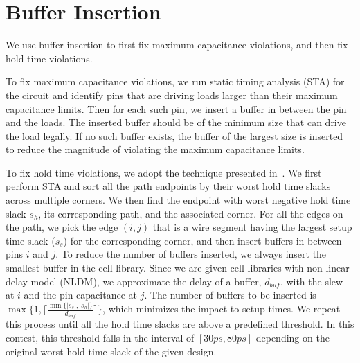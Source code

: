 \section{Buffer Insertion}
\label{sec:buf_insert}
We use buffer insertion to first fix maximum capacitance violations, and then fix hold time violations.

To fix maximum capacitance violations, we run static timing analysis (STA) for the circuit and identify pins that are driving loads larger than their maximum capacitance limits. Then for each such pin, we insert a buffer in between the pin and the loads. The inserted buffer should be of the minimum size that can drive the load legally. If no such buffer exists, the buffer of the largest size is inserted to reduce the magnitude of violating the maximum capacitance limits.

To fix hold time violations, we adopt the technique presented in~\cite{Shenoy:Minimum}. We first perform STA and sort all the path endpoints by their worst hold time slacks across multiple corners. We then find the endpoint with worst negative hold time slack $s_h$, its corresponding path, and the associated corner. For all the edges on the path, we pick the edge $(i, j)$ that is a wire segment having the largest setup time slack ($s_s$) for the corresponding corner, and then insert buffers in between pins $i$ and $j$. To reduce the number of buffers inserted, we always insert the smallest buffer in the cell library. Since we are given cell libraries with non-linear delay model (NLDM), we approximate the delay of a buffer, $d_{buf}$, with the slew at $i$ and the pin capacitance at $j$. The number of buffers to be inserted is $\max\{1, \lceil\frac{\min\{|s_s|, |s_h|\}}{d_{buf}}\rceil\}$, which minimizes the impact to setup times. We repeat this process until all the hold time slacks are above a predefined threshold. In this contest, this threshold falls in the interval of $[30ps, 80ps]$ depending on the original worst hold time slack of the given design.





